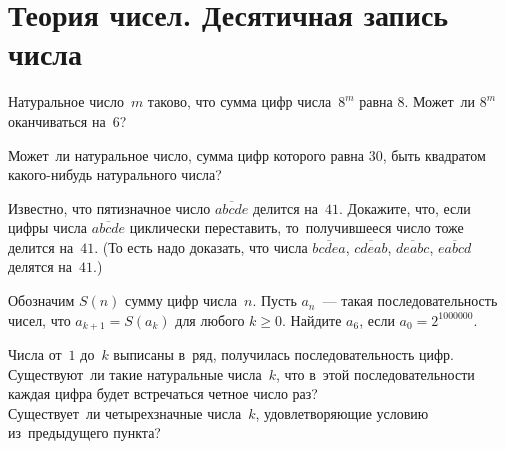
\section*{Теория чисел. Десятичная запись числа}


\begin{problems}


\item
Натуральное число~$m$ таково, что сумма цифр числа~$8^m$ равна $8$.
Может~ли $8^m$ оканчиваться на~$6$?

\item
Может~ли натуральное число, сумма цифр которого равна $30$, быть квадратом
какого-нибудь натурального числа?

\item
Известно, что пятизначное число $\overline{abcde}$ делится на~$41$.
Докажите, что, если цифры числа $\overline{abcde}$ циклически переставить,
то~получившееся число тоже делится на~$41$.
(То есть надо доказать, что числа $\overline{bcdea}$, $\overline{cdeab}$,
$\overline{deabc}$, $\overline{eabcd}$ делятся на~$41$.)

\item
Обозначим $S(n)$ сумму цифр числа~$n$.
Пусть $a_n$~--- такая последовательность чисел, что $a_{k+1} = S(a_{k})$ для
любого $k \geq 0$.
Найдите $a_6$, если $a_0 = 2^{1000000}$.

\item
Числа от~$1$ до~$k$ выписаны в~ряд, получилась последовательность цифр.
\\
\subproblem
Существуют~ли такие натуральные числа~$k$, что в~этой последовательности каждая
цифра будет встречаться четное число раз?
\\
\subproblem
Существует~ли четырехзначные числа~$k$, удовлетворяющие условию из~предыдущего
пункта?



\end{problems}
